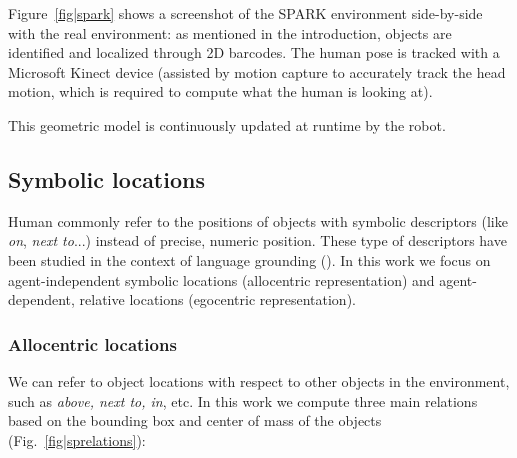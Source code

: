 \documentclass{svmult}
\begin{document}
Figure~\ref{fig|spark} shows a screenshot of the SPARK environment side-by-side
with the real environment: as mentioned in the introduction, objects are
identified and localized through 2D barcodes. The human pose is tracked with
a Microsoft Kinect device (assisted by motion capture to accurately track the
head motion, which is required to compute what the human is looking at).

This geometric model is continuously updated at runtime by the robot.

\subsection{Symbolic locations}

Human commonly refer to the positions of objects with symbolic descriptors
(like \emph{on}, \emph{next to}...) instead of precise, numeric position. These
type of descriptors have been studied in the context of language grounding
(\cite{O'Keefe1999,Matuszek2010,Regier2001,Kelleher2006,Blisard2005}). In this
work we focus on agent-independent symbolic locations (allocentric
representation)  and agent-dependent, relative locations (egocentric
representation).

\subsubsection{Allocentric locations}

We can refer to object locations with respect to other objects in the
environment, such as \emph{above, next to, in}, etc. In this work we compute
three main relations based on the bounding box and center of mass of the
objects (Fig.~\ref{fig|sprelations}): 
\end{document}
